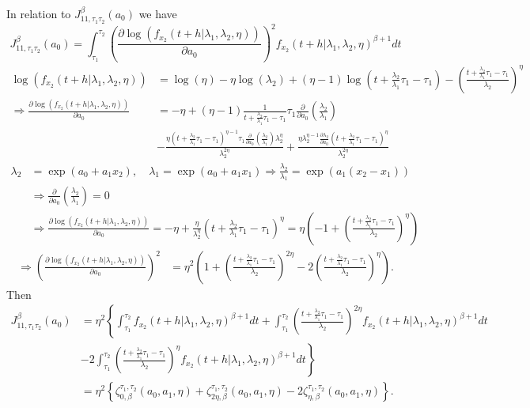 \documentclass{article}
\begin{document}
In relation to $J_{11,\tau_1\tau_2}^{\beta}(a_0)$ we have
\begin{equation*}
J_{11,\tau_1 \tau_2}^{\beta} (a_0)=\int_{\tau_1}^{\tau_2}\left(\frac{\partial \log\left(f_{x_2}(t+h|\lambda_1,\lambda_2,\eta)\right)}{\partial a_0}\right)^2 f_{x_2}(t+h|\lambda_1,\lambda_2,\eta)^{\beta+1}dt
\end{equation*}
\begin{align*}
\log \left(f_{x_2}(t+h|\lambda_1,\lambda_2,\eta)\right)&=\log(\eta)-\eta\log(\lambda_2)+(\eta-1)\log\left(t+\frac{\lambda_2}{\lambda_1}\tau_1-\tau_1\right)-\left(\frac{t+\frac{\lambda_2}{\lambda_1}\tau_1-\tau_1}{\lambda_2}\right)^{\eta}
\\
\Rightarrow \frac{\partial  \log \left(f_{x_2}(t+h|\lambda_1,\lambda_2,\eta)\right)}{\partial a_0}&=-\eta +(\eta-1)\frac{1}{t+\frac{\lambda_2}{\lambda_1}\tau_1-\tau_1}\tau_1\frac{\partial}{\partial a_0}\left(\frac{\lambda_2}{\lambda_1}\right)
\\
&-\frac{\eta\left(t+\frac{\lambda_2}{\lambda_1}\tau_1-\tau_1\right)^{\eta-1}\tau_1\frac{\partial}{\partial a_0}\left(\frac{\lambda_2}{\lambda_1}\right)\lambda_2^{\eta}}{\lambda_2^{2\eta}}+\frac{\eta\lambda_2^{\eta-1}\frac{\partial \lambda_2}{\partial a_0}\left(t+\frac{\lambda_2}{\lambda_1}\tau_1-\tau_1\right)^{\eta}}{\lambda_2^{2\eta}}
\end{align*}
\begin{align}
\lambda_2&=\exp(a_0+a_1x_2),\quad \lambda_1=\exp(a_0+a_1x_1) \Rightarrow \frac{\lambda_2}{\lambda_1}=\exp(a_1(x_2-x_1)) \nonumber
\\
&\Rightarrow \frac{\partial}{\partial a_0}\left(\frac{\lambda_2}{\lambda_1}\right)=0 \nonumber
\\
&\Rightarrow\frac{\partial  \log \left(f_{x_2}(t+h|\lambda_1,\lambda_2,\eta)\right)}{\partial a_0}=-\eta+\frac{\eta}{\lambda_2^{\eta}}\left(t+\frac{\lambda_2}{\lambda_1}\tau_1-\tau_1\right)^{\eta}=\eta\left(-1+\left(\frac{t+\frac{\lambda_2}{\lambda_1}\tau_1-\tau_1}{\lambda_2}\right)^{\eta}\right)
\label{eq:dev_f2_a0}
\end{align}
\begin{align*}
\Rightarrow \left( \frac{\partial  \log \left(f_{x_2}(t+h|\lambda_1,\lambda_2,\eta)\right)}{\partial a_0}\right)^2&=\eta^2\left(1+\left(\frac{t+\frac{\lambda_2}{\lambda_1}\tau_1-\tau_1}{\lambda_2}\right)^{2\eta}-2\left(\frac{t+\frac{\lambda_2}{\lambda_1}\tau_1-\tau_1}{\lambda_2}\right)^{\eta}\right).
\end{align*}
Then
\begin{align*}
J_{11,\tau_1\tau_2}^{\beta}(a_0)&=\eta^2\left\{\int_{\tau_1}^{\tau_2}f_{x_2}(t+h|\lambda_1,\lambda_2,\eta)^{\beta+1}dt+\int_{\tau_1}^{\tau_2}\left(\frac{t+\frac{\lambda_2}{\lambda_1}\tau_1-\tau_1}{\lambda_2}\right)^{2\eta}f_{x_2}(t+h|\lambda_1,\lambda_2,\eta)^{\beta+1}dt \right.
\\
&\left. -2\int_{\tau_1}^{\tau_2} \left(\frac{t+\frac{\lambda_2}{\lambda_1}\tau_1-\tau_1}{\lambda_2}\right)^\eta f_{x_2}(t+h|\lambda_1,\lambda_2,\eta)^{\beta+1}dt\right\}
\\
&=\eta^{2}\left\{\zeta_{0,\beta}^{\tau_1,\tau_2}(a_0,a_1,\eta)+\zeta_{2\eta,\beta}^{\tau_1,\tau_2}(a_0,a_1,\eta)-2\zeta_{\eta,\beta}^{\tau_1,\tau_2}(a_0,a_1,\eta)\right\}.
\end{align*}
\end{document}
